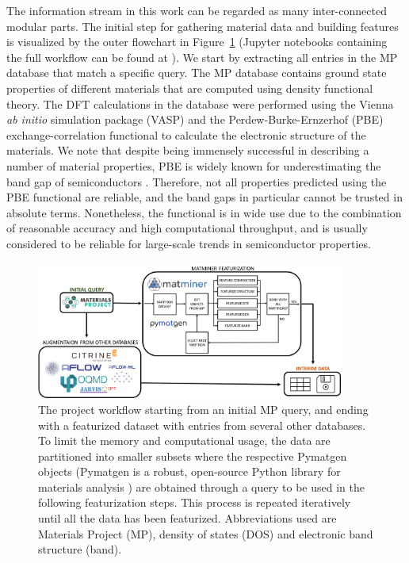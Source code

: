 \documentclass[superscriptaddress,unsortedaddress,
 amsmath,amssymb,
 aps,
]{revtex4-2}
\begin{document}
The information stream in this work can be regarded as many inter-connected modular parts. 
The initial step for gathering material data and building features is visualized by the outer flowchart in Figure~\ref{fig:flowchart} (Jupyter notebooks containing the full
workflow can be found at \cite{Ohebbi2021}).
We start by extracting all entries in the MP database that match a specific query. 
The MP database contains ground state properties of different materials that are computed using density functional theory. The DFT calculations in the database were performed using the Vienna {\em ab initio} simulation package (VASP) \cite{Kresse1996} and the Perdew-Burke-Ernzerhof (PBE) \cite{Perdew1996} exchange-correlation functional to calculate the electronic structure of the materials. 
We note that despite being immensely successful in describing a number of material properties, PBE is widely known for underestimating the band gap of semiconductors \cite{Freysoldt2014}. Therefore, not all properties predicted using the PBE functional are reliable, and the band gaps in particular cannot be trusted in absolute terms. Nonetheless, the functional is in wide use due to the combination of reasonable accuracy and high computational throughput, and is usually considered to be reliable for large-scale trends in semiconductor properties. 

\begin{figure}[t]
    \centering
    \includegraphics[width=0.9\textwidth]{figures/flow_chart_2.png}
    \caption{The project workflow starting from an initial MP query, and ending with a featurized dataset with entries from several other databases. 
    To limit the memory and computational usage, the data are partitioned into smaller subsets where the respective Pymatgen objects (Pymatgen is a robust, open-source Python library for materials analysis \cite{pymatgen}) are obtained through a query to be used in the following featurization steps. This process is repeated iteratively until all the data has been featurized. Abbreviations used are Materials Project (MP), density of states (DOS) and electronic band structure (band).
    }
    \label{fig:flowchart}
\end{figure}
\end{document}

